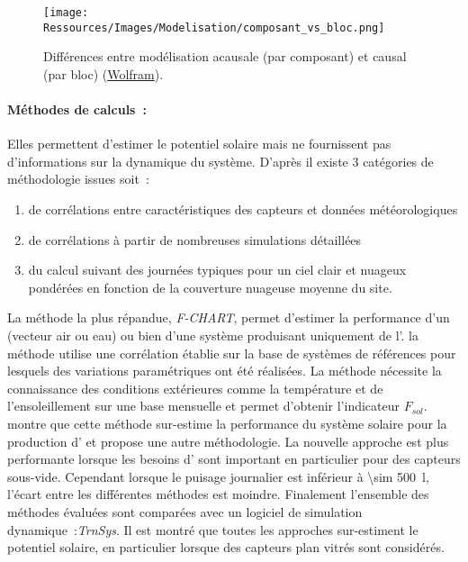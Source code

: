 \begin{figure}
    \centering
    \texttt{[image: Ressources/Images/Modelisation/composant\_vs\_bloc.png]}
    \caption{Différences entre modélisation acausale (par composant) et causal (par bloc)
             (\href{http://www.wolfram.com/system-modeler/}{Wolfram}).}
    \label{fig:acausal_vs_causal}
\end{figure}

\paragraph{Méthodes de calculs~:} %
\label{par:methodes_de_calculs}
Elles permettent d’estimer le potentiel solaire mais ne fournissent pas d’informations sur
la dynamique du système. D’après \textcite{Duffie1980} il existe $3$ catégories de
méthodologie issues soit~:
\begin{enumerate}
    \item de corrélations entre caractéristiques des capteurs et
          données météorologiques
    \item de corrélations à partir de nombreuses simulations détaillées
    \item du calcul suivant des journées typiques pour un ciel clair et nuageux
          pondérées en fonction de la couverture nuageuse moyenne du site.
\end{enumerate}
La méthode la plus répandue, \textit{F-CHART}, permet d’estimer la performance
d’un  (vecteur air ou eau) ou bien d’une système produisant uniquement de
l’. la méthode utilise une corrélation établie sur la base de systèmes de
références pour lesquels des variations paramétriques ont été réalisées. La méthode
nécessite la connaissance des conditions extérieures comme la température et de l’ensoleillement
sur une base mensuelle et permet d’obtenir l’indicateur $F_{sol}$. \textcite{Cuadros200796} montre que cette
méthode sur-estime la performance du système solaire pour la production d’ et
propose une autre méthodologie. La nouvelle approche est plus performante lorsque les
besoins d’ sont important en particulier pour des capteurs sous-vide. Cependant
lorsque le puisage journalier est inférieur à \SI{\sim 500}{\litre}, l’écart entre les
différentes méthodes est moindre. Finalement l’ensemble des méthodes évaluées sont
comparées avec un logiciel de simulation dynamique~:\textit{TrnSys}. Il est montré que
toutes les approches sur-estiment le potentiel solaire, en particulier lorsque des
capteurs plan vitrés sont considérés.

